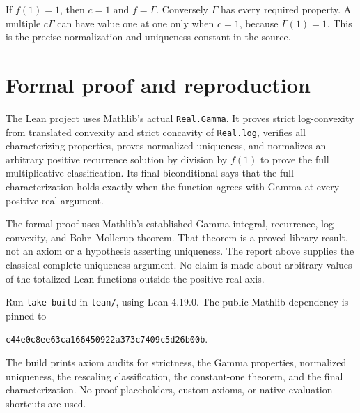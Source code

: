 \documentclass[11pt]{article}
\begin{document}
If $f(1)=1$, then $c=1$ and $f=\Gamma$. Conversely $\Gamma$ has every required property. A multiple $c\Gamma$ can have value one at one only when $c=1$, because $\Gamma(1)=1$. This is the precise normalization and uniqueness constant in the source.

\section{Formal proof and reproduction}
The Lean project uses Mathlib's actual \texttt{Real.Gamma}. It proves strict log-convexity from translated convexity and strict concavity of \texttt{Real.log}, verifies all characterizing properties, proves normalized uniqueness, and normalizes an arbitrary positive recurrence solution by division by $f(1)$ to prove the full multiplicative classification. Its final biconditional says that the full characterization holds exactly when the function agrees with Gamma at every positive real argument.

The formal proof uses Mathlib's established Gamma integral, recurrence, log-convexity, and Bohr--Mollerup theorem. That theorem is a proved library result, not an axiom or a hypothesis asserting uniqueness. The report above supplies the classical complete uniqueness argument. No claim is made about arbitrary values of the totalized Lean functions outside the positive real axis.

Run \texttt{lake build} in \texttt{lean/}, using Lean 4.19.0. The public Mathlib dependency is pinned to
\begin{center}\texttt{c44e0c8ee63ca166450922a373c7409c5d26b00b}.\end{center}
The build prints axiom audits for strictness, the Gamma properties, normalized uniqueness, the rescaling classification, the constant-one theorem, and the final characterization. No proof placeholders, custom axioms, or native evaluation shortcuts are used.
\end{document}
